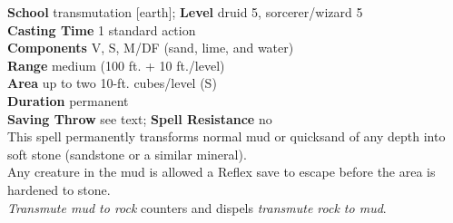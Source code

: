 \textbf{School} transmutation [earth]; \textbf{Level} druid 5, sorcerer/wizard 5\\
\textbf{Casting Time} 1 standard action\\
\textbf{Components} V, S, M/DF (sand, lime, and water)\\
\textbf{Range }medium (100 ft. + 10 ft./level)\\
\textbf{Area} up to two 10-ft. cubes/level (S)\\
\textbf{Duration} permanent\\
\textbf{Saving Throw} see text; \textbf{Spell Resistance} no\\
This spell permanently transforms normal mud or quicksand of any depth into soft stone (sandstone or a similar mineral).\\
Any creature in the mud is allowed a Reflex save to escape before the area is hardened to stone.\\
\textit{Transmute mud to rock }counters and dispels \textit{transmute rock to mud}.\\
